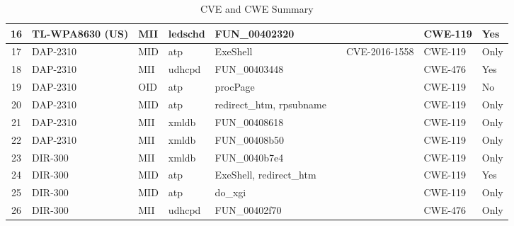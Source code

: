 \begin{table}[h]
\begin{tabular}{|c|l|l|l|l|c|l|l|l|}
\hline
16 & TL-WPA8630 (US) & MII & ledschd & FUN\_00402320 &  &  & CWE-119 & Yes \\
\hline
17 & DAP-2310 & MID & atp & ExeShell &  & CVE-2016-1558 & CWE-119 & Only \\
\hline
18 & DAP-2310 & MII & udhcpd & FUN\_00403448 &  &  & CWE-476 & Yes \\
\hline
19 & DAP-2310 & OID & atp & procPage &  &  & CWE-119 & No \\
\hline
20 & DAP-2310 & MID & atp & redirect\_htm, rpsubname &  &  & CWE-119 & Only \\
\hline
21 & DAP-2310 & MII & xmldb & FUN\_00408618 &  &  & CWE-119 & Only \\
\hline
22 & DAP-2310 & MII & xmldb & FUN\_00408b50 &  &  & CWE-119 & Only \\
\hline
23 & DIR-300 & MII & xmldb & FUN\_0040b7e4 &  &  & CWE-119 & Only \\
\hline
24 & DIR-300 & MID & atp & ExeShell, redirect\_htm &  &  & CWE-119 & Yes \\
\hline
25 & DIR-300 & MID & atp & do\_xgi &  &  & CWE-119 & Only \\
\hline
26 & DIR-300 & MII & udhcpd & FUN\_00402f70 &  &  & CWE-476 & Only \\
\hline
\end{tabular}
\caption{CVE and CWE Summary}
\end{table}
